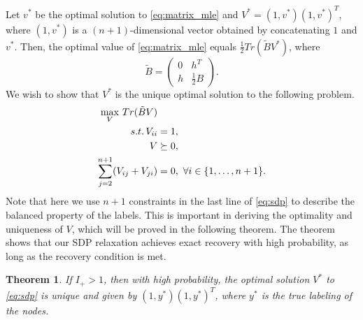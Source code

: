 \documentclass[conference]{IEEEtran}
\newtheorem{theorem}{Theorem}
\begin{document}
	Let $v^*$ be the optimal solution to \eqref{eq:matrix_mle} and $V^*=(1,v^*)(1,v^*)^T$, where $(1,v^*)$ is a $(n+1)$-dimensional  vector obtained by concatenating $1$ and $v^*$.
	Then, the optimal value of \eqref{eq:matrix_mle} equals $\frac{1}{2}Tr(\widetilde{B}V^*)$, where
	\begin{equation}\label{eq:B_lambda_def}
		\widetilde{B} = \begin{pmatrix} 0 & h^T  \\ h  & \frac{1}{2}B \end{pmatrix}.
	\end{equation}
	We wish to show that $V^*$ is the unique optimal solution to the following problem.
	\begin{align}
		\max_V\, Tr(\tilde{B}V)  &\notag\\
		s.t.\, V_{ii} &= 1, \notag\\
		V &\succeq 0, \notag\\
\sum_{j=2}^{n+1} (V_{ij} + V_{ji})& = 0,~\forall i\in\{1,\ldots,n+1\}. \label{eq:sdp}
	\end{align}
	Note that here we use $n+1$ constraints in the last line of \eqref{eq:sdp} to describe the balanced property of the labels. This is important in deriving the optimality and uniqueness of $V$, which will be proved in the following theorem. The theorem shows that our SDP relaxation achieves exact recovery with high probability, as long as the recovery condition is met.
	\begin{theorem}\label{thm:sdp}
		If $I_+ > 1$, then with high probability, the optimal solution
		$V^*$ to \eqref{eq:sdp} is unique and given by $(1,y^*)(1,y^*)^T$, where $y^*$ is the true labeling of the nodes.
	\end{theorem}
\end{document}
